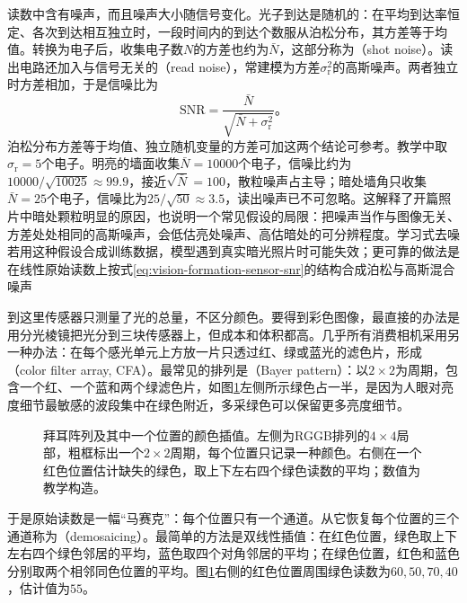 读数中含有噪声，而且噪声大小随信号变化。光子到达是随机的：在平均到达率恒定、各次到达相互独立时，一段时间内的到达个数服从泊松分布，其方差等于均值。转换为电子后，收集电子数$N$的方差也约为$\bar N$，这部分称为（shot noise）。读出电路还加入与信号无关的（read noise），常建模为方差$\sigma_{\mathrm r}^2$的高斯噪声。两者独立时方差相加，于是信噪比为
\begin{equation}
  \mathrm{SNR}=\frac{\bar N}{\sqrt{\bar N+\sigma_{\mathrm r}^2}}\text{。}
  \label{eq:vision-formation-sensor-snr}
\end{equation}
泊松分布方差等于均值、独立随机变量的方差可加这两个结论可参考。教学中取$\sigma_{\mathrm r}=5$个电子。明亮的墙面收集$\bar N=10000$个电子，信噪比约为$10000/\sqrt{10025}\approx99.9$，接近$\sqrt{\bar N}=100$，散粒噪声占主导；暗处墙角只收集$\bar N=25$个电子，信噪比为$25/\sqrt{50}\approx3.5$，读出噪声已不可忽略。这解释了开篇照片中暗处颗粒明显的原因，也说明一个常见假设的局限：把噪声当作与图像无关、方差处处相同的高斯噪声，会低估亮处噪声、高估暗处的可分辨程度。学习式去噪若用这种假设合成训练数据，模型遇到真实暗光照片时可能失效；更可靠的做法是在线性原始读数上按式\eqref{eq:vision-formation-sensor-snr}的结构合成泊松与高斯混合噪声

到这里传感器只测量了光的总量，不区分颜色。要得到彩色图像，最直接的办法是用分光棱镜把光分到三块传感器上，但成本和体积都高。几乎所有消费相机采用另一种办法：在每个感光单元上方放一片只透过红、绿或蓝光的滤色片，形成（color filter array, CFA）。最常见的排列是（Bayer pattern）：以$2\times2$为周期，包含一个红、一个蓝和两个绿滤色片，如图\ref{fig:vision-formation-bayer}左侧所示绿色占一半，是因为人眼对亮度细节最敏感的波段集中在绿色附近，多采绿色可以保留更多亮度细节。

\begin{figure}[htbp]
  \centering
  
  \caption{拜耳阵列及其中一个位置的颜色插值。左侧为RGGB排列的$4\times4$局部，粗框标出一个$2\times2$周期，每个位置只记录一种颜色。右侧在一个红色位置估计缺失的绿色，取上下左右四个绿色读数的平均；数值为教学构造。}
  \label{fig:vision-formation-bayer}
\end{figure}

于是原始读数是一幅“马赛克”：每个位置只有一个通道。从它恢复每个位置的三个通道称为（demosaicing）。最简单的方法是双线性插值：在红色位置，绿色取上下左右四个绿色邻居的平均，蓝色取四个对角邻居的平均；在绿色位置，红色和蓝色分别取两个相邻同色位置的平均。图\ref{fig:vision-formation-bayer}右侧的红色位置周围绿色读数为$60,50,70,40$，估计值为$55$。

